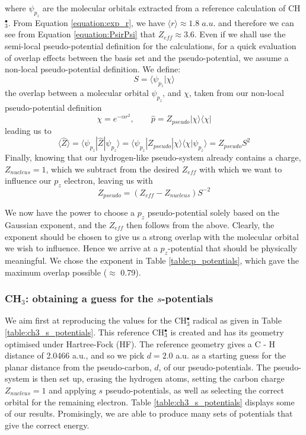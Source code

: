 \documentclass[12pt]{article}
\begin{document}
where \(\psi_{p_{z}}\) are the molecular orbitals extracted from a reference calculation of CH\(^{\bullet}_{3}\). From Equation \ref{equation:exp_r}, we have \( \langle r \rangle \approx 1.8\;a.u.\) and therefore we can see from Equation \ref{equation:PsirPsi} that \(Z_{eff} \approx 3.6\). Even if we shall use the semi-local pseudo-potential definition for the calculations, for a quick evaluation of overlap effects between the basis set and the pseudo-potential, we assume a non-local pseudo-potential definition. We define:
\begin{equation}
S = \langle \psi_{p_{z}} | \chi \rangle
\end{equation}
the overlap between a molecular orbital \(\psi_{p_{z}}\), and \(\chi\), taken from our non-local pseudo-potential definition \cite{huzinaga_effective_1991}
\begin{equation}
\chi = e^{-\alpha r^{2}},\qquad \widehat{p} = Z_{pseudo} | \chi \rangle \langle \chi |
\end{equation}
leading us to
\begin{equation}
\langle \widehat{Z} \rangle = \langle \psi_{p_{z}} | \widehat{Z} | \psi_{p_{z}} \rangle = \langle \psi_{p_{z}} | Z_{pseudo} | \chi \rangle \langle \chi | \psi_{p_{z}} \rangle = Z_{pseudo} S^{2}
\end{equation}
Finally, knowing that our hydrogen-like pseudo-system already contains a charge, \(Z_{nucleus}=1\), which we subtract from the desired \(Z_{eff}\) with which we want to influence our \(p_{z}\) electron, leaving us with
\begin{equation}
Z_{pseudo} = (Z_{eff} - Z_{nucleus})S^{-2}
\end{equation}

We now have the power to choose a \(p_{z}\) pseudo-potential solely based on the Gaussian exponent, and the \(Z_{eff}\) then follows from the above. Clearly, the exponent should be chosen to give us a strong overlap with the molecular orbital we wish to influence. Hence we arrive at a \(p_{z}\)-potential that should be physically meaningful. We chose the exponent in Table \ref{table:p_potentials}, which gave the maximum overlap possible ($\approx$ 0.79).

\subsubsection*{\sffamily \large CH\(_{3}\): obtaining a guess for the \(s\)-potentials}

We aim first at reproducing the values for the CH\(^{\bullet}_{3}\) radical as given in Table \ref{table:ch3_s_potentials}. 
This reference CH\(^{\bullet}_{3}\) is created and has its geometry optimised under Hartree-Fock (HF).
The reference geometry gives a C - H distance of 2.0466 a.u., and so we pick \(d = 2.0\) a.u.
as a starting guess for the planar distance from the pseudo-carbon, \(d\), of our pseudo-potentials.
The pseudo-system is then set up, erasing the hydrogen atoms, setting the carbon charge \(Z_{nucleus} = 1\) and applying \(s\) pseudo-potentials,
as well as selecting the correct orbital for the remaining electron.
Table \ref{table:ch3_s_potentials} displays some of our results.
Promisingly, we are able to produce many sets of potentials that give the correct energy.
\end{document}
